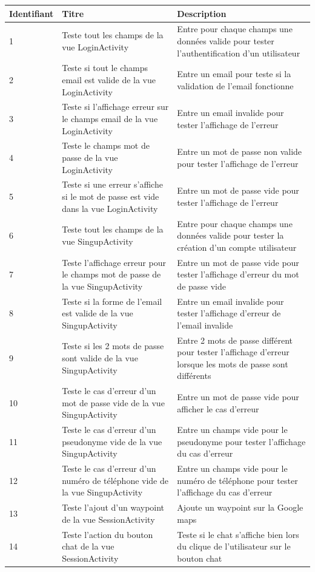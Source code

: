 \documentclass[titlepage, 12pt]{report}
\begin{document}
\begin{table}[ht]
\begin{tabularx}{\textwidth}{|X|X|X|}
	\hline
	Identifiant & Titre & Description \\
	\hline
	1 & Teste tout les champs de la vue LoginActivity & Entre pour chaque champs une données valide pour tester l'authentification d'un utilisateur \\
	\hline
	2 & Teste si tout le champs email est valide de la vue LoginActivity & Entre un email pour teste si la validation de l'email fonctionne \\	
	\hline
	3 & Teste si l'affichage erreur sur le champs email de la vue LoginActivity & Entre un email invalide pour tester l'affichage de l'erreur \\
	\hline
	4 & Teste le champs mot de passe de la vue LoginActivity & Entre un mot de passe non valide pour tester l'affichage de l'erreur \\
	\hline
	5 & Teste si une erreur s'affiche si le mot de passe est vide dans la vue LoginActivity & Entre un mot de passe vide pour tester l'affichage de l'erreur \\
	\hline
	6 & Teste tout les champs de la vue SingupActivity & Entre pour chaque champs une données valide pour tester la création d'un compte utilisateur \\
	\hline
	7 & Teste l'affichage erreur pour le champs mot de passe de la vue SingupActivity & Entre un mot de passe vide pour tester l'affichage d'erreur du mot de passe vide \\
	\hline
	8 & Teste si la forme de l'email est valide de la vue SingupActivity & Entre un email invalide pour tester l'affichage d'erreur de l'email invalide  \\
	\hline
	9 & Teste si les 2 mots de passe sont valide de la vue SingupActivity & Entre 2 mots de passe différent pour tester l'affichage d'erreur lorsque les mots de passe sont différents \\
	\hline
	10 & Teste le cas d'erreur d'un mot de passe vide de la vue SingupActivity & Entre un mot de passe vide pour afficher le cas d'erreur  \\
	\hline
	11 & Teste le cas d'erreur d'un pseudonyme vide  de la vue SingupActivity & Entre un champs vide pour le pseudonyme pour tester l'affichage du cas d'erreur \\
	\hline
	12 & Teste le cas d'erreur d'un numéro de téléphone vide de la vue SingupActivity & Entre un champs vide pour le numéro de téléphone pour tester l'affichage du cas d'erreur  \\
	\hline
	13 & Teste l'ajout d'un waypoint de la vue SessionActivity & Ajoute un waypoint sur la Google maps  \\
	\hline
	14 & Teste l'action du bouton chat de la vue SessionActivity & Teste si le chat s'affiche bien lors du clique de l'utilisateur sur le bouton chat  \\
	\hline \hline
\end{tabularx}
\end{table}
\end{document}
